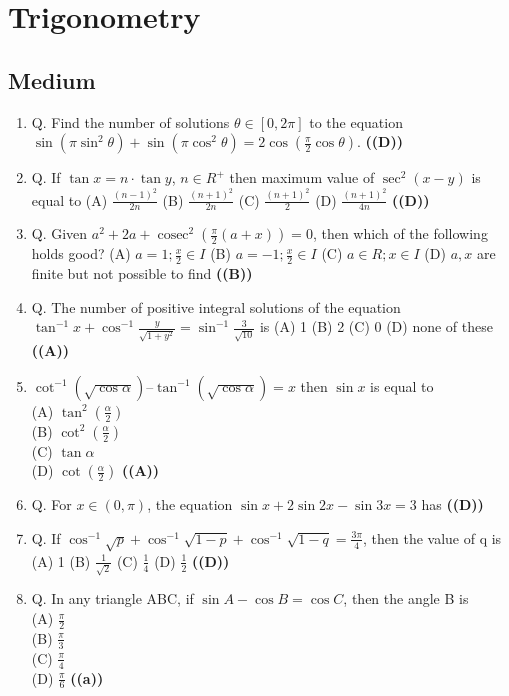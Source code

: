 \documentclass{article}
\begin{document}
\section{Trigonometry}
\subsection{Medium}
\begin{enumerate}
\item Q. Find the number of solutions $\theta \in [0, 2\pi]$ to the equation
$\sin(\pi \sin^2 \theta) + \sin(\pi \cos^2 \theta) = 2\cos(\frac{\pi}{2} \cos \theta)$. \hfill \textbf{((D))}
\item Q. If $\tan x = n\cdot \tan y$, $n \in R^+$ then maximum value of $\sec^2(x - y)$ is equal to
(A) $\frac{(n-1)^2}{2n}$
(B) $\frac{(n+1)^2}{2n}$
(C) $\frac{(n+1)^2}{2}$
(D) $\frac{(n+1)^2}{4n}$ \hfill \textbf{((D))}
\item Q. Given $a^2 + 2a + \operatorname{cosec}^2 \left(\frac{\pi}{2}(a+x)\right) = 0$, then which of the following holds good?
(A) $a = 1; \frac{x}{2} \in I$
(B) $a = -1; \frac{x}{2} \in I$
(C) $a \in R; x \in I$
(D) $a, x$ are finite but not possible to find \hfill \textbf{((B))}
\item Q. The number of positive integral solutions of the equation $\tan^{-1}x + \cos^{-1}\frac{y}{\sqrt{1+y^2}} = \sin^{-1}\frac{3}{\sqrt{10}}$ is
(A) 1
(B) 2
(C) 0
(D) none of these \hfill \textbf{((A))}
\item $\cot^{-1}(\sqrt{\cos \alpha}) – \tan^{-1}(\sqrt{\cos \alpha}) = x$ then $\sin x$ is equal to\\
(A) $\tan^2 (\frac{\alpha}{2})$\\
(B) $\cot^2 (\frac{\alpha}{2})$\\
(C) $\tan \alpha$\\
(D) $\cot (\frac{\alpha}{2})$ \hfill \textbf{((A))}
\item Q. For $x \in (0, \pi)$, the equation $\sin x + 2 \sin 2x - \sin 3x = 3$ has \hfill \textbf{((D))}
\item Q. If $\cos^{-1} \sqrt{p} + \cos^{-1} \sqrt{1 - p} + \cos^{-1} \sqrt{1 - q} = \frac{3\pi}{4}$, then the value of q is
(A) 1
(B) $\frac{1}{\sqrt{2}}$
(C) $\frac{1}{4}$
(D) $\frac{1}{2}$ \hfill \textbf{((D))}
\item Q. In any triangle ABC, if $\sin A - \cos B = \cos C$, then the angle B is \\ (A) $\frac{\pi}{2}$ \\ (B) $\frac{\pi}{3}$ \\ (C) $\frac{\pi}{4}$ \\ (D) $\frac{\pi}{6}$ \hfill \textbf{((a))}

\end{enumerate}
\end{document}
